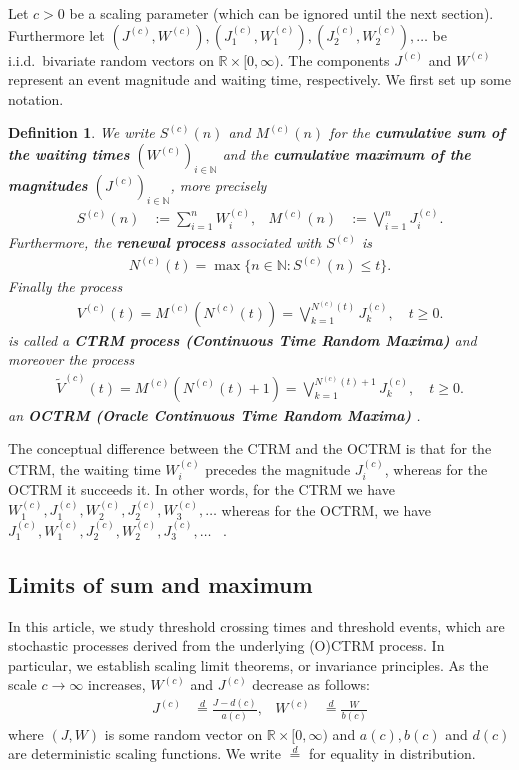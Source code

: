\documentclass[12pt]{article}
\newtheorem{definition}[equation]{Definition}
\newcommand{\N}{\mathbb{N}}
\newcommand{\1}{\mathbf 1}
\begin{document}
Let $c > 0$ be a scaling parameter (which can be ignored until the next section). Furthermore let $(J^{(c)},W^{(c)}),(J^{(c)}_1,W^{(c)}_1),(J^{(c)}_2,W^{(c)}_2), \ldots$ be i.i.d.\ bivariate random vectors on $\mathbb R \times [0, \infty)$. The components $J^{(c)}$ and $W^{(c)}$ represent an event magnitude and waiting time, respectively. We first set up some notation.  


\begin{definition}
We write $S^{(c)}(n)$ and $M^{(c)}(n)$ for the \textbf{cumulative sum of the waiting times} $(W^{(c)})_{i \in \N}$ and the \textbf{cumulative maximum of the magnitudes} $(J^{(c)})_{i \in \N}$, more precisely 
\begin{align}
S^{(c)}(n) &:= \sum_{i=1}^n W^{(c)}_i, 
&
M^{(c)}(n) &:= \bigvee_{i=1}^n J^{(c)}_i.
\end{align} 
Furthermore, the \textbf{renewal process} associated with $S^{(c)}$ is 
\begin{align} \label{eq:renewal-process}
N^{(c)}(t) = \max\{n \in \mathbb N: S^{(c)}(n) \le t\}.
\end{align}
Finally the process
\begin{align}
V^{(c)}(t) 
= M^{(c)}\left( N^{(c)}(t) \right) 
= \bigvee_{k=1}^{N^{(c)}(t)} J^{(c)}_k, \quad t \ge 0.
\end{align}
is called a \textbf{CTRM process (Continuous Time Random Maxima)} and moreover the process
\begin{align}
\tilde V^{(c)}(t) 
= M^{(c)}\left( N^{(c)}(t) + 1 \right) 
= \bigvee_{k=1}^{N^{(c)}(t) + 1} J^{(c)}_k, \quad t \ge 0.
\end{align}
an \textbf{OCTRM (Oracle Continuous Time Random Maxima)}
.
\end{definition}

The conceptual difference between the CTRM and the OCTRM is that for the CTRM, 
the waiting time $W^{(c)}_i$ precedes the magnitude $J^{(c)}_i$, whereas for 
the OCTRM it succeeds it. In other words, for the CTRM we have $W^{(c)}_1, J^{(c)}_1, W^{(c)}_2, J^{(c)}_2, W^{(c)}_3, \ldots$ whereas for the OCTRM, we have $J^{(c)}_1, W^{(c)}_1, J^{(c)}_2, W^{(c)}_2, J^{(c)}_3, \ldots$ \ . 


\subsection{Limits of sum and maximum}

In this article, we study threshold crossing times and threshold events, which are stochastic processes derived from the underlying (O)CTRM process. In particular, we establish scaling limit theorems, or invariance principles. As the scale $c \to \infty$ increases, $W^{(c)}$ and $J^{(c)}$ decrease as follows: 
\begin{align}
J^{(c)} &\stackrel{d}{=} \frac{J - d(c)}{a(c)}, 
& 
W^{(c)} &\stackrel{d}{=} \frac{W}{b(c)}
\end{align}
where $(J,W)$ is some random vector on $\mathbb R \times [0,\infty)$ and
$a(c), b(c)$ and $d(c)$ are deterministic scaling functions. We write $\stackrel{d}{=}$ for equality in distribution. 
\end{document}
